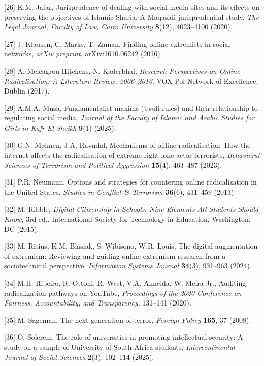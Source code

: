 \documentclass[11pt,a4paper]{article}
\begin{document}
	[26] K.M. Jafar, Jurisprudence of dealing with social media sites and its effects on preserving the objectives of Islamic Sharia: A Maqasidi jurisprudential study, \textit{The Legal Journal, Faculty of Law, Cairo University} \textbf{8}(12), 4023--4100 (2020).
	
	[27] J. Klausen, C. Marks, T. Zaman, Finding online extremists in social networks, \textit{arXiv preprint}, arXiv:1610.06242 (2016).
	
	[28] A. Meleagrou-Hitchens, N. Kaderbhai, \textit{Research Perspectives on Online Radicalisation: A Literature Review, 2006--2016}, VOX-Pol Network of Excellence, Dublin (2017).
	
	[29] A.M.A. Musa, Fundamentalist maxims (Usuli rules) and their relationship to regulating social media, \textit{Journal of the Faculty of Islamic and Arabic Studies for Girls in Kafr El-Sheikh} \textbf{9}(1) (2025).
	
	[30] G.N. Mølmen, J.A. Ravndal, Mechanisms of online radicalisation: How the internet affects the radicalisation of extreme-right lone actor terrorists, \textit{Behavioral Sciences of Terrorism and Political Aggression} \textbf{15}(4), 463--487 (2023).
	
	[31] P.R. Neumann, Options and strategies for countering online radicalization in the United States, \textit{Studies in Conflict \& Terrorism} \textbf{36}(6), 431--459 (2013).
	
	[32] M. Ribble, \textit{Digital Citizenship in Schools: Nine Elements All Students Should Know}, 3rd ed., International Society for Technology in Education, Washington, DC (2015).
	
	[33] M. Risius, K.M. Blasiak, S. Wibisono, W.R. Louis, The digital augmentation of extremism: Reviewing and guiding online extremism research from a sociotechnical perspective, \textit{Information Systems Journal} \textbf{34}(3), 931--963 (2024).
	
	[34] M.H. Ribeiro, R. Ottoni, R. West, V.A. Almeida, W. Meira Jr., Auditing radicalization pathways on YouTube, \textit{Proceedings of the 2020 Conference on Fairness, Accountability, and Transparency}, 131--141 (2020).
	
	[35] M. Sageman, The next generation of terror, \textit{Foreign Policy} \textbf{165}, 37 (2008).
	
	[36] O. Solerem, The role of universities in promoting intellectual security: A study on a sample of University of South Africa students, \textit{Intercontinental Journal of Social Sciences} \textbf{2}(3), 102--114 (2025).
	
\end{document}

